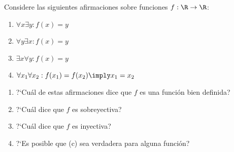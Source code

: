 \begin{problema}
	Considere las siguientes afirmaciones sobre funciones $f: \R \to \R$:
	\begin{enumerate}
		\item $\forall x \exists y: f(x) = y$
		\item $\forall y \exists x: f(x) = y$
		\item $\exists x \forall y: f(x) = y$
		\item $\forall x_1 \forall x_2: f(x_1) = f(x_2) \imply x_1 = x_2$
	\end{enumerate}
	\begin{enumerate}
		\item ?`Cuál de estas afirmaciones dice que $f$ es una función bien definida?
		\item ?`Cuál dice que $f$ es sobreyectiva?
		\item ?`Cuál dice que $f$ es inyectiva?
		\item ?`Es posible que (c) sea verdadera para alguna función?
	\end{enumerate}
\end{problema}
